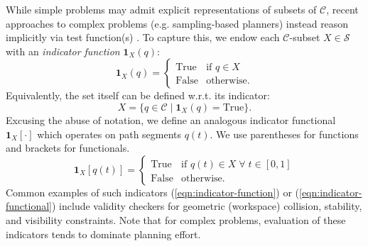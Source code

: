 While simple problems may admit explicit representations of
subsets of $\mathcal{C}$,
recent approaches to complex problems
(e.g. sampling-based planners)
instead reason implicitly via test function(s)
\citep{lavalle2006planningbook}.
To capture this,
we endow each $\mathcal{C}$-subset $X \in \mathcal{S}$ with an
\emph{indicator function} $\mathbf{1}_X(q)$:
\begin{equation}
  \mathbf{1}_X(q) =
    \left\{ \begin{array}{ll}
      \mbox{True} & \mbox{if } q \in X \\
      \mbox{False} & \mbox{otherwise}.
    \end{array} \right.
  \label{eqn:indicator-function}
\end{equation}
Equivalently, the set itself can be defined w.r.t. its indicator:
\begin{equation}
  X = \{ q \in \mathcal{C} \;|\; \mathbf{1}_X(q) = \mbox{True} \} .
\end{equation}
Excusing the abuse of notation,
we define an analogous indicator functional $\mathbf{1}_X[\cdot]$
which operates on path segments $q(t)$.
We use parentheses for functions and brackets for functionals.
\begin{equation}
  \mathbf{1}_X[q(t)] =
    \left\{ \begin{array}{ll}
      \mbox{True} & \mbox{if } q(t) \in X \;\forall\; t \in [0,1] \\
      \mbox{False} & \mbox{otherwise}.
    \end{array} \right.
  \label{eqn:indicator-functional}
\end{equation}
Common examples of such indicators
(\ref{eqn:indicator-function}) or (\ref{eqn:indicator-functional})
include validity checkers for
geometric (workspace) collision,
stability, and visibility constraints.
Note that for complex problems,
evaluation of these indicators 
tends to dominate planning effort.

